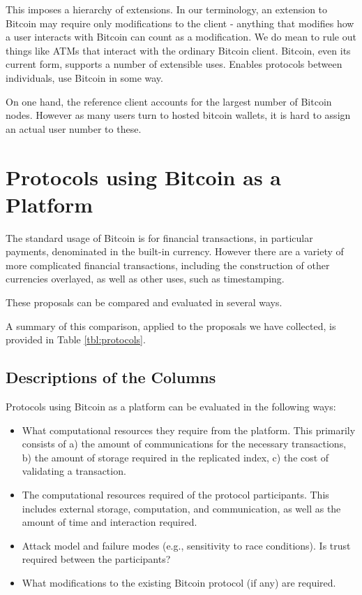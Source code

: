 This imposes a hierarchy of extensions. In our terminology, an extension to Bitcoin may require only modifications to the client - anything that modifies how a user interacts with Bitcoin can count as a modification. We do mean to rule out things like ATMs that interact with the ordinary Bitcoin client. Bitcoin, even its current form, supports a number of extensible uses. Enables protocols between individuals, use Bitcoin in some way.

On one hand, the reference client accounts for the largest number of Bitcoin nodes. However as many users turn to hosted bitcoin wallets, it is hard to assign an actual user number to these.



\section{ Protocols using Bitcoin as a Platform }

The standard usage of Bitcoin is for financial transactions, in particular payments, denominated in the built-in currency. However there are a variety of more complicated financial transactions, including the construction of other currencies overlayed, as well as other uses, such as timestamping.

These proposals can be compared and evaluated in several ways.

A summary of this comparison, applied to the proposals we have collected, is provided in Table \ref{tbl:protocols}.

\subsection{Descriptions of the Columns}
Protocols using Bitcoin as a platform can be evaluated in the following ways:
\begin{itemize}
\item What computational resources they require from the platform. This primarily consists of a) the amount of communications for the necessary transactions, b) the amount of storage required in the replicated index, c) the cost of validating a transaction.
\item The computational resources required of the protocol participants. This includes external storage, computation, and communication, as well as the amount of time and interaction required.
\item Attack model and failure modes (e.g., sensitivity to race conditions). Is trust required between the participants?
\item What modifications to the existing Bitcoin protocol (if any) are required.
\end{itemize}


